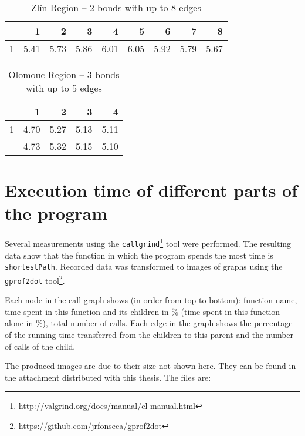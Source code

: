\vspace{-3pt}

\begin{table}[H]
	\caption{Zlín Region -- $2$-bonds with up to 8 edges}
	\centering
	\begin{tabular}{c|rrrrrrrr}
		\toprule
   & 1    & 2    & 3    & 4    & 5    & 6    & 7    & 8    \\ \hline
1  & 5.41 & 5.73 & 5.86 & 6.01 & 6.05 & 5.92 & 5.79 & 5.67 \\
	\end{tabular}
\end{table}

\vspace{-3pt}

\begin{table}[H]
	\caption{Olomouc Region -- $3$-bonds with up to 5 edges}
	\centering
	\begin{tabular}{c|rrrr}
		\toprule
		        & 1    & 2    & 3  	 & 4	  \\ \hline
		1       & 4.70 & 5.27 & 5.13 & 5.11  \\
		\evenrowcolor
		2       & 4.73 & 5.32 & 5.15 & 5.10 \\
	\end{tabular}
\end{table}

\section{Execution time of different parts of the program}

Several measurements using the \lstinline|callgrind|\footnote{\url{http://valgrind.org/docs/manual/cl-manual.html}} tool were performed. The resulting data show that the function in which the program spends the most time is \lstinline|shortestPath|. Recorded data was transformed to images of graphs using the \lstinline|gprof2dot| tool\footnote{\url{https://github.com/jrfonseca/gprof2dot}}.

Each node in the call graph shows (in order from top to bottom): function name, time spent in this function and its children in \% (time spent in this function alone in \%), total number of calls. Each edge in the graph shows the percentage of the running time transferred from the children to this parent and the number of calls of the child.

The produced images are due to their size not shown here. They can be found in the attachment distributed with this thesis. The files are:

